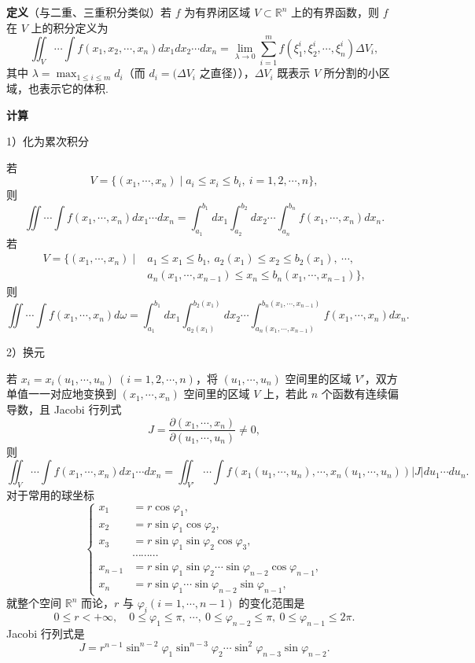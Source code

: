 \documentclass[UTF8, 12pt, fontset=fandol, oneside]{ctexart}
\begin{document}
\noindent\textbf{定义}\quad （与二重、三重积分类似）若 $f$ 为有界闭区域 $V\subset\mathbb R^n$ 上的有界函数，则 $f$ 在 $V$ 上的积分定义为
\[
\iint_V\cdots\int f(x_1,x_2,\cdots,x_n)dx_1dx_2\cdots dx_n
=\lim_{\lambda\to0}\sum_{i=1}^m f(\xi_1^i,\xi_2^i,\cdots,\xi_n^i)\Delta V_i, \tag{A}
\]
其中 $\lambda=\max_{1\le i\le m}d_i$（而 $d_i=(\Delta V_i$ 之直径）），$\Delta V_i$ 既表示 $V$ 所分割的小区域，也表示它的体积.

\noindent\textbf{计算}

1）化为累次积分

若
\[
V=\{(x_1,\cdots,x_n)\mid a_i\le x_i\le b_i,\ i=1,2,\cdots,n\},
\]
则
\[
\iint\cdots\int f(x_1,\cdots,x_n)dx_1\cdots dx_n
=\int_{a_1}^{b_1}dx_1\int_{a_2}^{b_2}dx_2\cdots
\int_{a_n}^{b_n}f(x_1,\cdots,x_n)dx_n. \tag{a}
\]
若
\[
\begin{aligned}
V=\{(x_1,\cdots,x_n)\mid {}&a_1\le x_1\le b_1,\
a_2(x_1)\le x_2\le b_2(x_1),\ \cdots,\\
&a_n(x_1,\cdots,x_{n-1})\le x_n\le
b_n(x_1,\cdots,x_{n-1})\},
\end{aligned} \tag{b}
\]
则
\[
\iint\cdots\int f(x_1,\cdots,x_n)d\omega
=\int_{a_1}^{b_1}dx_1\int_{a_2(x_1)}^{b_2(x_1)}dx_2\cdots
\int_{a_n(x_1,\cdots,x_{n-1})}^{b_n(x_1,\cdots,x_{n-1})}
f(x_1,\cdots,x_n)dx_n. \tag{c}
\]

2）换元

若 $x_i=x_i(u_1,\cdots,u_n)\ (i=1,2,\cdots,n)$，将 $(u_1,\cdots,u_n)$ 空间里的区域 $V'$，双方单值一一对应地变换到 $(x_1,\cdots,x_n)$ 空间里的区域 $V$ 上，若此 $n$ 个函数有连续偏导数，且 Jacobi 行列式
\[
J=\frac{\partial(x_1,\cdots,x_n)}{\partial(u_1,\cdots,u_n)}\ne0,
\]
则
\[
\iint_V\cdots\int f(x_1,\cdots,x_n)dx_1\cdots dx_n
=\iint_{V'}\cdots\int f(x_1(u_1,\cdots,u_n),\cdots,x_n(u_1,\cdots,u_n))|J|du_1\cdots du_n. \tag{d}
\]
对于常用的球坐标
\[
\left\{
\begin{aligned}
x_1&=r\cos\varphi_1,\\
x_2&=r\sin\varphi_1\cos\varphi_2,\\
x_3&=r\sin\varphi_1\sin\varphi_2\cos\varphi_3,\\
&\cdots\cdots\cdots\\
x_{n-1}&=r\sin\varphi_1\sin\varphi_2\cdots\sin\varphi_{n-2}\cos\varphi_{n-1},\\
x_n&=r\sin\varphi_1\cdots\sin\varphi_{n-2}\sin\varphi_{n-1},
\end{aligned}\right. \tag{e}
\]
就整个空间 $\mathbb R^n$ 而论，$r$ 与 $\varphi_i(i=1,\cdots,n-1)$ 的变化范围是
\[
0\le r<+\infty,\quad 0\le\varphi_1\le\pi,\ \cdots,\ 0\le\varphi_{n-2}\le\pi,\ 0\le\varphi_{n-1}\le2\pi.
\]
Jacobi 行列式是
\[
J=r^{n-1}\sin^{n-2}\varphi_1\sin^{n-3}\varphi_2\cdots
\sin^2\varphi_{n-3}\sin\varphi_{n-2}.
\]
\end{document}
